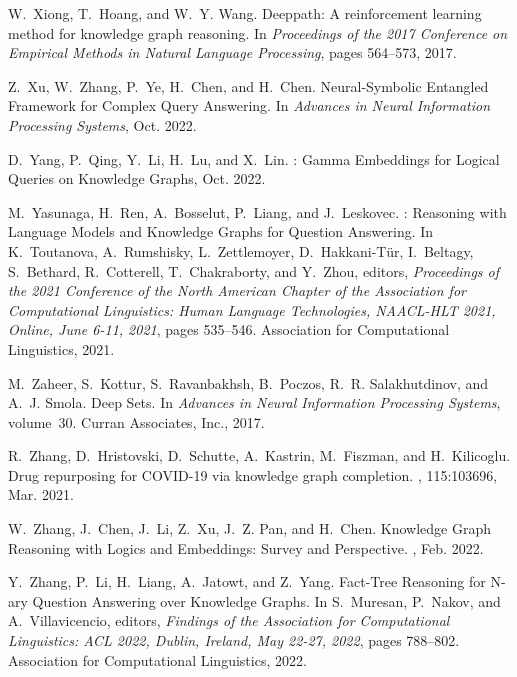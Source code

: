 \documentclass[11pt]{article}
\begin{document}
\begin{thebibliography}{10}
\begin{small}
W.~Xiong, T.~Hoang, and W.~Y. Wang.
\newblock Deeppath: A reinforcement learning method for knowledge graph
  reasoning.
\newblock In {\em Proceedings of the 2017 Conference on Empirical Methods in
  Natural Language Processing}, pages 564--573, 2017.

Z.~Xu, W.~Zhang, P.~Ye, H.~Chen, and H.~Chen.
\newblock Neural-{{Symbolic Entangled Framework}} for {{Complex Query
  Answering}}.
\newblock In {\em Advances in {{Neural Information Processing Systems}}}, Oct.
  2022.

D.~Yang, P.~Qing, Y.~Li, H.~Lu, and X.~Lin.
: {{Gamma Embeddings}} for {{Logical Queries}} on
  {{Knowledge Graphs}}, Oct. 2022.

M.~Yasunaga, H.~Ren, A.~Bosselut, P.~Liang, and J.~Leskovec.
: {{Reasoning}} with {{Language Models}} and {{Knowledge
  Graphs}} for {{Question Answering}}.
\newblock In K.~Toutanova, A.~Rumshisky, L.~Zettlemoyer, D.~{Hakkani-T{\"u}r},
  I.~Beltagy, S.~Bethard, R.~Cotterell, T.~Chakraborty, and Y.~Zhou, editors,
  {\em Proceedings of the 2021 {{Conference}} of the {{North American Chapter}}
  of the {{Association}} for {{Computational Linguistics}}: {{Human Language
  Technologies}}, {{NAACL-HLT}} 2021, {{Online}}, {{June}} 6-11, 2021}, pages
  535--546. {Association for Computational Linguistics}, 2021.

M.~Zaheer, S.~Kottur, S.~Ravanbakhsh, B.~Poczos, R.~R. Salakhutdinov, and A.~J.
  Smola.
\newblock Deep {{Sets}}.
\newblock In {\em Advances in {{Neural Information Processing Systems}}},
  volume~30. {Curran Associates, Inc.}, 2017.

R.~Zhang, D.~Hristovski, D.~Schutte, A.~Kastrin, M.~Fiszman, and H.~Kilicoglu.
\newblock Drug repurposing for {{COVID-19}} via knowledge graph completion.
, 115:103696, Mar. 2021.

W.~Zhang, J.~Chen, J.~Li, Z.~Xu, J.~Z. Pan, and H.~Chen.
\newblock Knowledge {{Graph Reasoning}} with {{Logics}} and {{Embeddings}}:
  {{Survey}} and {{Perspective}}.
, Feb. 2022.

Y.~Zhang, P.~Li, H.~Liang, A.~Jatowt, and Z.~Yang.
\newblock Fact-{{Tree Reasoning}} for {{N-ary Question Answering}} over
  {{Knowledge Graphs}}.
\newblock In S.~Muresan, P.~Nakov, and A.~Villavicencio, editors, {\em Findings
  of the {{Association}} for {{Computational Linguistics}}: {{ACL}} 2022,
  {{Dublin}}, {{Ireland}}, {{May}} 22-27, 2022}, pages 788--802. {Association
  for Computational Linguistics}, 2022.


\end{small}
\end{thebibliography}
\end{document}

